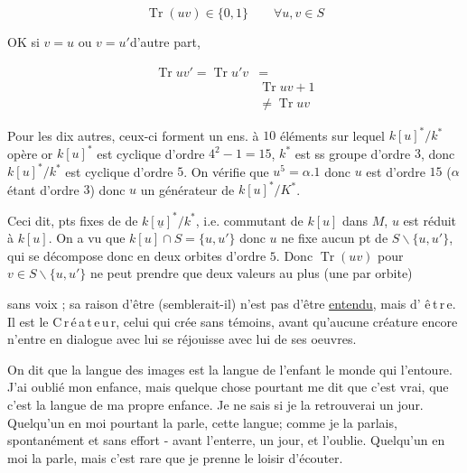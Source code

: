 \[
\operatorname{Tr}(uv)\in\{0,1\}\qquad\forall u,v\in S
\]


OK si $v=u$ ou $v=u'$\qquad d'autre part,

\[
\begin{aligned}\operatorname{Tr}uv'=\operatorname{Tr}u'v&=\\[-2pt]&\operatorname{Tr}uv+1\\&\ne\operatorname{Tr}uv\end{aligned}
\]

Pour les dix autres, ceux-ci forment un ens. à $10$ éléments sur lequel $k[u]^*/k^*$ opère or $k[u]^*$ est cyclique d'ordre $4^2-1=15$, $k^*$ est ss groupe d'ordre $3$, donc $k[u]^*/k^*$ est cyclique d'ordre $5$. On vérifie que $u^5=\alpha.1$ donc $u$ est d'ordre $15$ ($\alpha$ étant d'ordre $3$) donc $u$  un générateur de $k[u]^*/K^*$.

Ceci dit, pts fixes de    de $k[\underline u]^*/k^*$, i.e.  commutant de $k[u]$ dans $M$,  $u$ est réduit à $k[u]$. On a vu que $k[u]\cap S=\{u,u'\}$ donc $u$ ne fixe aucun pt de $S\smallsetminus\{u,u'\}$, qui se décompose donc en deux orbites d'ordre $5$. Donc $\operatorname{Tr}(uv)$ pour $v\in S\smallsetminus\{u,u'\}$ ne peut prendre que deux valeurs au plus (une par orbite)



sans voix ;  sa raison d'être (semblerait-il) n'est pas d'être \uline{entendu}, mais d' \mbox{ê\,t\,r\,e}. Il est le \mbox{C\,r\,é\,a\,t\,e\,u\,r}, celui qui crée sans témoins, avant qu'aucune créature encore n'entre en dialogue avec lui   se réjouisse avec lui de ses oeuvres.

On dit que la langue des images est la langue de l'enfant\handwritten{,}  le monde qui l'entoure. J'ai  oublié mon enfance, mais quelque chose pourtant me dit que c'est  vrai, que c'est  la langue de ma propre enfance. Je ne sais si je la retrouverai un jour. Quelqu'un en moi pourtant la parle, cette langue; comme je la parlais, spontanément et sans effort - avant  l'enterre, un jour, et l'oublie. Quelqu'un en moi la parle, mais c'est rare que je prenne le loisir d'écouter.

